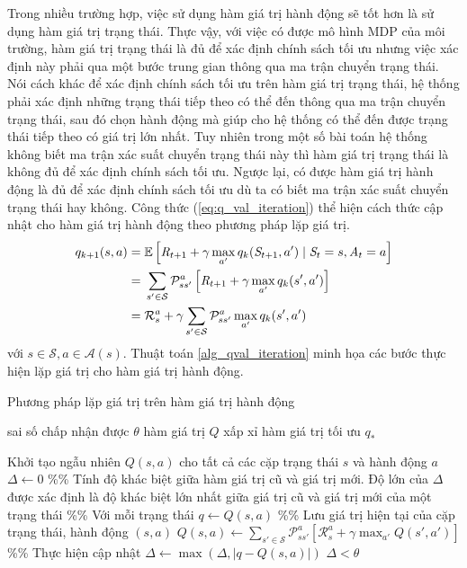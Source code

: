 Trong nhiều trường hợp, việc sử dụng hàm giá trị hành động sẽ tốt hơn là sử dụng hàm giá trị trạng thái. 
Thực vậy, với việc có được mô hình MDP của môi trường, hàm giá trị trạng thái là đủ để xác định chính sách tối ưu nhưng việc xác định này phải qua một bước trung gian thông qua ma trận chuyển trạng thái. 
Nói cách khác để xác định chính sách tối ưu trên hàm giá trị trạng thái, hệ thống phải xác định những trạng thái tiếp theo có thể đến thông qua ma trận chuyển trạng thái, sau đó chọn hành động mà giúp cho hệ thống có thể đến được trạng thái tiếp theo có giá trị lớn nhất. 
Tuy nhiên trong một số bài toán hệ thống không biết ma trận xác suất chuyển trạng thái này thì hàm giá trị trạng thái là không đủ để xác định chính sách tối ưu. 
Ngược lại, có được hàm giá trị hành động là đủ để xác định chính sách tối ưu dù ta có biết ma trận xác suất chuyển trạng thái hay không.
Công thức (\ref{eq:q_val_iteration}) thể hiện cách thức cập nhật cho hàm giá trị hành động theo phương pháp lặp giá trị.
\begin{align}
q_{k+1}(s,a) = {} & \mathbb{E}\left[\mathit{R}_{t+1} + \gamma \max_{a'}q_{k}(\mathit{S}_{t+1},a') \mid \mathit{S}_{t} = s, \mathit{A}_t = a\right] \notag \\
= {} & \sum_{s' \in \mathcal{S}}\mathcal{P}_{ss'}^{a}\left[\mathit{R}_{t+1} + \gamma \max_{a'}q_{k}(s',a')\right] \notag \\
= {} & \mathcal{R}_{s}^{a} + \gamma \sum_{s' \in \mathcal{S}}\mathcal{P}_{ss'}^{a} \max_{a'}q_{k}(s',a') 
\label{eq:q_val_iteration}
\end{align}
với $s \in \mathcal{S}, a \in \mathcal{A}(s)$. 
Thuật toán \ref{alg_qval_iteration} minh họa các bước thực hiện lặp giá trị cho hàm giá trị hành động.

\begin{algorithm}
	\caption{Phương pháp lặp giá trị trên hàm giá trị hành động}
	\label{alg_qval_iteration}
	\begin{algorithmic}[1]
		\renewcommand{\algorithmicrequire}{\textbf{Đầu vào:}}
		\renewcommand{\algorithmicensure}{\textbf{Đầu ra:}}
		\algnewcommand{}
		\algnewcommand\Operation{\item[\algorithmicoperation]}
		
		\Require sai số chấp nhận được $\theta$
		\Ensure hàm giá trị $Q$ xấp xỉ hàm giá trị tối ưu $q_{*}$
		
		\Operation
		\State Khởi tạo ngẫu nhiên $Q(s,a)$ cho tất cả các cặp trạng thái $s$ và hành động $a$
		\Repeat
		\State $\Delta \leftarrow 0$ \%\% Tính độ khác biệt giữa hàm giá trị cũ và giá trị mới. Độ lớn của $\Delta$ được xác định là độ khác biệt lớn nhất giữa giá trị cũ và giá trị mới của một trạng thái
		 \%\% Với mỗi trạng thái
		\State $q \leftarrow Q(s,a)$ \%\% Lưu giá trị hiện tại của cặp trạng thái, hành động $(s,a)$
		\State $Q(s,a) \leftarrow \sum_{s' \in \mathcal{S}}\mathcal{P}_{ss'}^{a}\left[\mathcal{R}_{s}^{a} + \gamma \max_{a'}Q(s',a')\right]$ \%\% Thực hiện cập nhật
		\State $\Delta \leftarrow \max(\Delta,|q - Q(s,a)|)$
		\EndFor
		\Until $\Delta < \theta$
	\end{algorithmic}
\end{algorithm}



